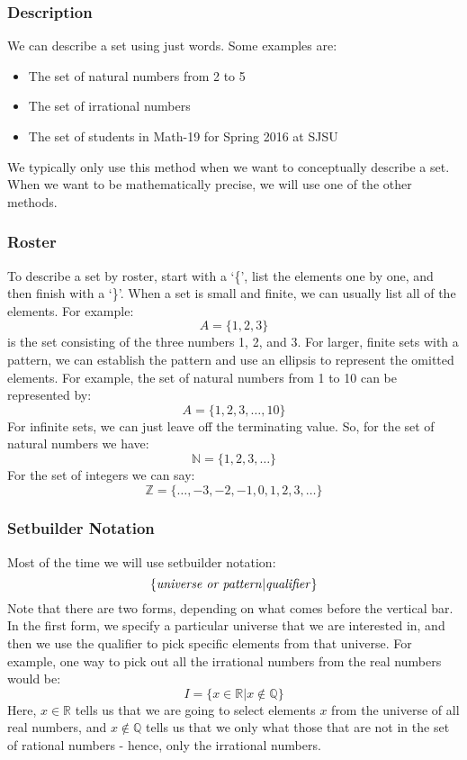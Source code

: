 \documentclass[letterpaper,12pt,fleqn]{article}
\begin{document}
\subsubsection*{Description}

We can describe a set using just words. Some examples are:
\begin{itemize}
\item The set of natural numbers from 2 to 5
\item The set of irrational numbers
\item The set of students in Math-19 for Spring 2016 at SJSU
\end{itemize}
We typically only use this method when we want to conceptually describe a set.
When we want to be mathematically precise, we will use one of the other
methods.

\subsubsection*{Roster}

To describe a set by roster, start with a `\{', list the elements one by one,
and then finish with a `\}'. When a set is small and finite, we can usually
list all of the elements.  For example:
\[A=\{1, 2, 3\}\]
is the set consisting of the three numbers 1, 2, and 3. For larger, finite sets
with a pattern, we can establish the pattern and use an ellipsis to represent
the omitted elements. For example, the set of natural numbers from 1 to 10 can
be represented by:
\[A=\{1, 2, 3, \ldots, 10\}\]
For infinite sets, we can just leave off the terminating value. So, for the
set of natural numbers we have:
\[\mathbb{N}=\{1, 2, 3, \ldots\}\]
For the set of integers we can say:
\[\mathbb{Z}=\{\ldots, -3, -2, -1, 0, 1, 2, 3, \ldots\}\]

\subsubsection*{Setbuilder Notation}

Most of the time we will use setbuilder notation:
\[\{\mbox{\emph{universe or pattern}} | \mbox{\emph{qualifier}}\}\]
Note that there are two forms, depending on what comes before the vertical bar.
In the first form, we specify a particular universe that we are interested in,
and then we use the qualifier to pick specific elements from that universe.
For example, one way to pick out all the irrational numbers from the real
numbers would be:
\[I=\{x\in\mathbb{R}|x\notin\mathbb{Q}\}\]
Here, $x\in\mathbb{R}$ tells us that we are going to select elements $x$ from
the universe of all real numbers, and $x\notin\mathbb{Q}$ tells us that we only
what those that are not in the set of rational numbers - hence, only the
irrational numbers.
\end{document}

